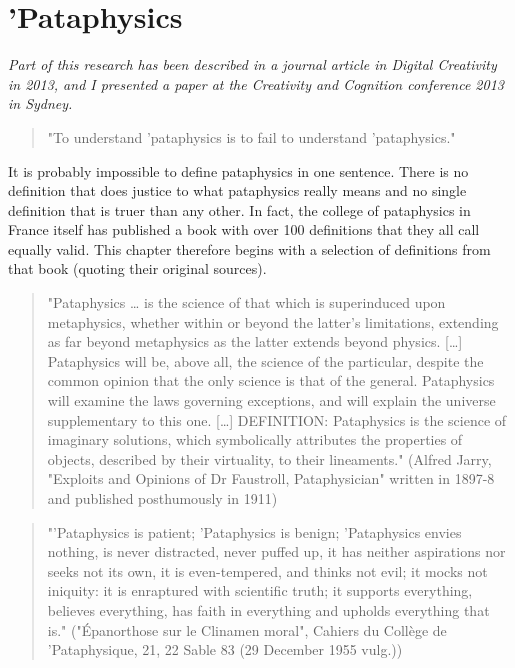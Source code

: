 
\chapter{'Pataphysics}
\label{ch:pataphysics}

\emph{Part of this research has been described in a journal article in Digital Creativity in 2013, and I presented a paper at the Creativity and Cognition conference 2013 in Sydney.}

\grule

\begin{quote}
  "To understand 'pataphysics is to fail to understand 'pataphysics." \citep{Hugill2012a}
\end{quote}

It is probably impossible to define pataphysics in one sentence. There is no definition that does justice to what pataphysics really means and no single definition that is truer than any other. In fact, the college of pataphysics in France itself has published a book \citep{Brotchie2003} with over 100 definitions that they all call equally valid. This chapter therefore begins with a selection of definitions from that book (quoting their original sources).

\begin{quote}
  "Pataphysics … is the science of that which is superinduced upon metaphysics, whether within or beyond the latter's limitations, extending as far beyond metaphysics as the latter extends beyond physics. […] Pataphysics will be, above all, the science of the particular, despite the common opinion that the only science is that of the general. Pataphysics will examine the laws governing exceptions, and will explain the universe supplementary to this one. […] DEFINITION: Pataphysics is the science of imaginary solutions, which symbolically attributes the properties of objects, described by their virtuality, to their lineaments." (Alfred Jarry, "Exploits and Opinions of Dr Faustroll, Pataphysician" written in 1897-8 and published posthumously in 1911) \citep{Jarry1996}
\end{quote}

\begin{quote}
  "'Pataphysics is patient; 'Pataphysics is benign; 'Pataphysics envies nothing, is never distracted, never puffed up, it has neither aspirations nor seeks not its own, it is even-tempered, and thinks not evil; it mocks not iniquity: it is enraptured with scientific truth; it supports everything, believes everything, has faith in everything and upholds everything that is." ("Épanorthose sur le Clinamen moral", Cahiers du Collège de 'Pataphysique, 21, 22 Sable 83 (29 December 1955 vulg.)) \citep{Brotchie2003}
\end{quote}


